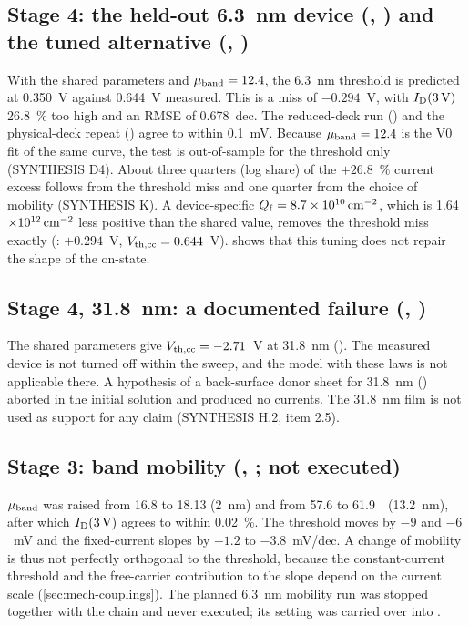 \subsection{Stage 4: the held-out 6.3~nm device (, ) and the tuned alternative (, )}
With the shared parameters and $\mu_{\mathrm{band}}=12.4$, the 6.3~nm threshold is predicted at 0.350~V against 0.644~V measured. This is a miss of $-0.294$~V, with $I_{\mathrm{D}}(3\,\mathrm{V})$ 26.8~\% too high and an RMSE of 0.678~dec. The reduced-deck run () and the physical-deck repeat () agree to within 0.1~mV. Because $\mu_{\mathrm{band}}=12.4$ is the V0 fit of the same curve, the test is out-of-sample for the threshold only (SYNTHESIS D4). About three quarters (log share) of the $+26.8$~\% current excess follows from the threshold miss and one quarter from the choice of mobility (SYNTHESIS K). A device-specific $Q_{\mathrm{f}}=\SI{8.7e10}{cm^{-2}}$, which is 1.64$\times10^{12}\,\mathrm{cm}^{-2}$ less positive than the shared value, removes the threshold miss exactly (: $+0.294$~V, $V_{\mathrm{th,cc}}=0.644$~V).  shows that this tuning does not repair the shape of the on-state.

\subsection{Stage 4, 31.8~nm: a documented failure (, )}
The shared parameters give $V_{\mathrm{th,cc}}=-2.71$~V at 31.8~nm (). The measured device is not turned off within the sweep, and the model with these laws is not applicable there. A hypothesis of a back-surface donor sheet for 31.8~nm () aborted in the initial solution and produced no currents. The 31.8~nm film is not used as support for any claim (SYNTHESIS H.2, item 2.5).

\subsection{Stage 3: band mobility (, ;  not executed)}
$\mu_{\mathrm{band}}$ was raised from 16.8 to 18.13 (2~nm) and from 57.6 to 61.9~\cmVs\ (13.2~nm), after which $I_{\mathrm{D}}(3\,\mathrm{V})$ agrees to within 0.02~\%. The threshold moves by $-9$ and $-6$~mV and the fixed-current slopes by $-1.2$ to $-3.8$~mV/dec. A change of mobility is thus not perfectly orthogonal to the threshold, because the constant-current threshold and the free-carrier contribution to the slope depend on the current scale (\cref{sec:mech-couplings}). The planned 6.3~nm mobility run  was stopped together with the chain and never executed; its setting was carried over into .

